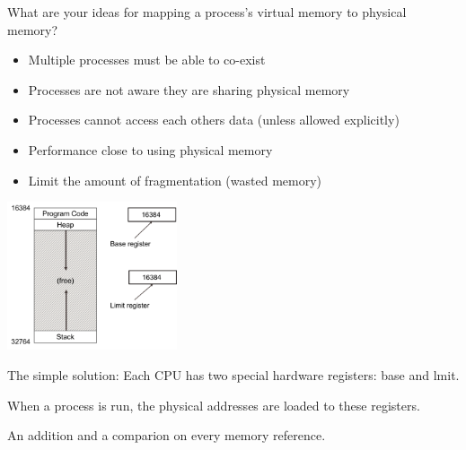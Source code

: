 \begin{slide}
    

    What are your ideas for mapping a process's virtual memory to physical
    memory?

\end{slide}

\begin{slide}


    \begin{itemize}
      \item Multiple processes must be able to co-exist
      \item Processes are not aware they are sharing physical memory
      \item Processes cannot access each others data (unless allowed explicitly)
      \item Performance close to using physical memory
      \item Limit the amount of fragmentation (wasted memory)
    \end{itemize}

\end{slide}
  
\begin{slide}


    \begin{minipage}{0.4\textwidth}
        \includegraphics[width=50mm]{base-limit-reg.png}
    \end{minipage}
    \hfill
    \begin{minipage}{0.58\textwidth}
        The simple solution: Each CPU has two special hardware registers: base and lmit.
        \bigskip

        When a process is run, the physical addresses are loaded to these registers.
        \bigskip

        An addition and a comparion on every memory reference.
        \bigskip
    \end{minipage}

\end{slide}

